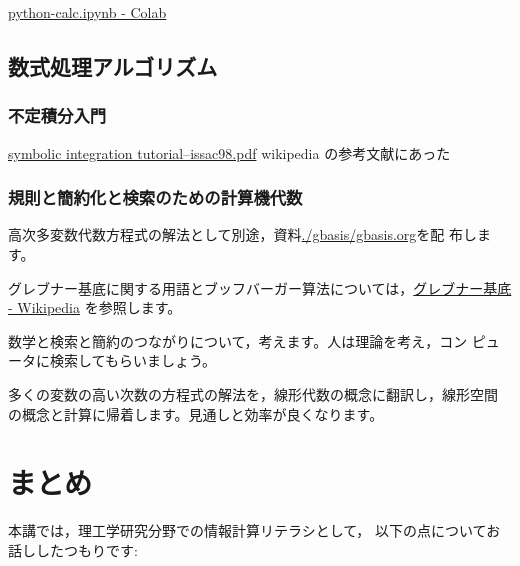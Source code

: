 \documentclass[dvipdfmx,11pat]{jarticle}
\begin{document}
\href{https://colab.research.google.com/drive/13-xrzx125aD3L4mzB5BhOHAUyLeV6kCX}{python-calc.ipynb - Colab} 
\subsection{数式処理アルゴリズム}
\label{sec:org8893fc9}
\subsubsection{不定積分入門}
\label{sec:org923c2df}
\href{http://www-sop.inria.fr/cafe/Manuel.Bronstein/publications/issac98.pdf}{symbolic integration tutorial--issac98.pdf}
wikipedia の参考文献にあった
\subsubsection{規則と簡約化と検索のための計算機代数}
\label{sec:orgf8d5208}

高次多変数代数方程式の解法として別途，資料\url{./gbasis/gbasis.org}を配
布します。

グレブナー基底に関する用語とブッフバーガー算法については，\href{https://ja.wikipedia.org/wiki/\%E3\%82\%B0\%E3\%83\%AC\%E3\%83\%96\%E3\%83\%8A\%E3\%83\%BC\%E5\%9F\%BA\%E5\%BA\%95}{グレブナー基底 - Wikipedia} 
を参照します。

数学と検索と簡約のつながりについて，考えます。人は理論を考え，コン
ピュータに検索してもらいましょう。

多くの変数の高い次数の方程式の解法を，線形代数の概念に翻訳し，線形空間
の概念と計算に帰着します。見通しと効率が良くなります。
\section{まとめ}
\label{sec:orgeb7cd2a}
本講では，理工学研究分野での情報計算リテラシとして，
以下の点についてお話ししたつもりです:
\end{document}
